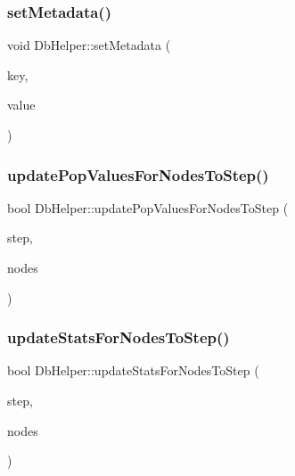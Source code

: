 \subsubsection{\texorpdfstring{setMetadata()}{setMetadata()}}
{\footnotesize\ttfamily void Db\+Helper\+::set\+Metadata (\begin{DoxyParamCaption}\item[{Q\+String}]{key,  }\item[{Q\+String}]{value }\end{DoxyParamCaption})}

\mbox{\label{class_db_helper_af78f6e35dd87d9b0729925aeae977e2c}} 
\subsubsection{\texorpdfstring{updatePopValuesForNodesToStep()}{updatePopValuesForNodesToStep()}}
{\footnotesize\ttfamily bool Db\+Helper\+::update\+Pop\+Values\+For\+Nodes\+To\+Step (\begin{DoxyParamCaption}\item[{int}]{step,  }\item[{Q\+List$<$ std\+::shared\+\_\+ptr$<$ \mbox{\hyperlink{class_node_data}{Node\+Data}} $>$ $>$ \&}]{nodes }\end{DoxyParamCaption})}

\mbox{\label{class_db_helper_a4dea6149cb96f9da25635278d7cd9fa0}} 
\subsubsection{\texorpdfstring{updateStatsForNodesToStep()}{updateStatsForNodesToStep()}}
{\footnotesize\ttfamily bool Db\+Helper\+::update\+Stats\+For\+Nodes\+To\+Step (\begin{DoxyParamCaption}\item[{int}]{step,  }\item[{Q\+List$<$ std\+::shared\+\_\+ptr$<$ \mbox{\hyperlink{class_node_data}{Node\+Data}} $>$ $>$ \&}]{nodes }\end{DoxyParamCaption})}

